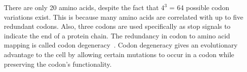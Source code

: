 \documentclass[USenglish,oneside,twocolumn]{article}
\begin{document}
There are only 20 amino acids, despite the fact that $4^3$ = 64 possible codon variations exist. This is because many amino acids are correlated with up to five redundant codons. Also, three codons are used specifically as stop signals to indicate the end of a protein chain. The redundancy in codon to amino acid mapping is called codon degeneracy~\cite{WBBGLL2008}. Codon degeneracy gives an evolutionary advantage to the cell by allowing certain mutations to occur in a codon while preserving the codon’s functionality.

\begin{center}
\end{center}
\end{document}
